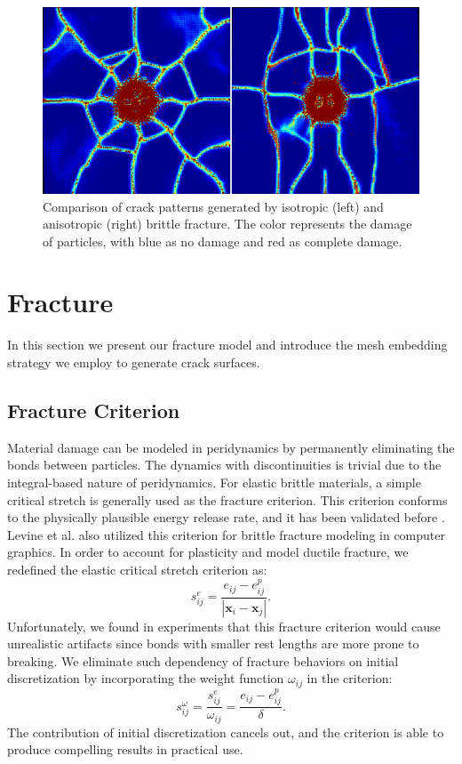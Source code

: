 \begin{figure}[t]
  \centering
  \includegraphics[width=\linewidth, bb=0 0 1400 700]{./figs/demo_impact_color_map.png}
  \caption{\label{fig:5}
  Comparison of crack patterns generated by isotropic (left) and anisotropic (right) brittle fracture. The color represents the damage of particles, with blue as no damage and red as complete damage.
}
\end{figure}

\section{Fracture}

In this section we present our fracture model and introduce the mesh embedding strategy we employ to generate crack surfaces.

\subsection{Fracture Criterion}

Material damage can be modeled in peridynamics by permanently eliminating the bonds between particles. The dynamics with discontinuities is trivial due to the integral-based nature of peridynamics. For elastic brittle materials, a simple critical stretch is generally used as the fracture criterion. This criterion conforms to the physically plausible energy release rate, and it has been validated before \cite{Silling2005}. Levine et al.\cite{Levine:2015:PPS:2849517.2849526} also utilized this criterion for brittle fracture modeling in computer graphics. In order to account for plasticity and model ductile fracture, we redefined the elastic critical stretch criterion as:
\begin{equation}
s_{ij}^e =\frac{e_{ij}-e_{ij}^p}{|\mathbf{x}_i-\mathbf{x}_j|}.
\label{eq:17}
\end{equation}
Unfortunately,  we found in experiments that this fracture criterion would cause unrealistic artifacts since bonds with smaller rest lengths are more prone to breaking. We eliminate such dependency of fracture behaviors on initial discretization by  incorporating the weight function $\omega_{ij}$ in the criterion:
\begin{equation}
s_{ij}^\omega = \frac{s_{ij}^e}{\omega_{ij}} = \frac{e_{ij}-e_{ij}^p}{\delta}.
\label{eq:18}
\end{equation}
The contribution of  initial discretization cancels out, and the criterion is able to produce compelling results in practical use.

